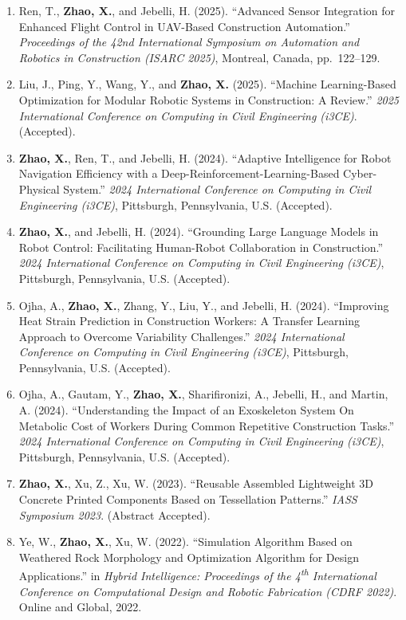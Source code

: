 \documentclass[11pt,a4paper]{article}
\begin{document}
\begin{enumerate}[leftmargin=1.5em, resume]
    \item Ren, T., \textbf{Zhao, X.}, and Jebelli, H. (2025). ``Advanced Sensor Integration for Enhanced Flight Control in UAV-Based Construction Automation.'' \textit{Proceedings of the 42nd International Symposium on Automation and Robotics in Construction (ISARC 2025)}, Montreal, Canada, pp.\ 122--129.

    \item Liu, J., Ping, Y., Wang, Y., and \textbf{Zhao, X.} (2025). ``Machine Learning-Based Optimization for Modular Robotic Systems in Construction: A Review.'' \textit{2025 International Conference on Computing in Civil Engineering (i3CE)}. (Accepted).

    \item \textbf{Zhao, X.}, Ren, T., and Jebelli, H. (2024). ``Adaptive Intelligence for Robot Navigation Efficiency with a Deep-Reinforcement-Learning-Based Cyber-Physical System.'' \textit{2024 International Conference on Computing in Civil Engineering (i3CE)}, Pittsburgh, Pennsylvania, U.S. (Accepted).

    \item \textbf{Zhao, X.}, and Jebelli, H. (2024). ``Grounding Large Language Models in Robot Control: Facilitating Human-Robot Collaboration in Construction.'' \textit{2024 International Conference on Computing in Civil Engineering (i3CE)}, Pittsburgh, Pennsylvania, U.S. (Accepted).

    \item Ojha, A., \textbf{Zhao, X.}, Zhang, Y., Liu, Y., and Jebelli, H. (2024). ``Improving Heat Strain Prediction in Construction Workers: A Transfer Learning Approach to Overcome Variability Challenges.'' \textit{2024 International Conference on Computing in Civil Engineering (i3CE)}, Pittsburgh, Pennsylvania, U.S. (Accepted).

    \item Ojha, A., Gautam, Y., \textbf{Zhao, X.}, Sharifironizi, A., Jebelli, H., and Martin, A. (2024). ``Understanding the Impact of an Exoskeleton System On Metabolic Cost of Workers During Common Repetitive Construction Tasks.'' \textit{2024 International Conference on Computing in Civil Engineering (i3CE)}, Pittsburgh, Pennsylvania, U.S. (Accepted).

    \item \textbf{Zhao, X.}, Xu, Z., Xu, W. (2023). ``Reusable Assembled Lightweight 3D Concrete Printed Components Based on Tessellation Patterns.'' \textit{IASS Symposium 2023}. (Abstract Accepted).

    \item Ye, W., \textbf{Zhao, X.}, Xu, W. (2022). ``Simulation Algorithm Based on Weathered Rock Morphology and Optimization Algorithm for Design Applications.'' in \textit{Hybrid Intelligence: Proceedings of the 4\textsuperscript{th} International Conference on Computational Design and Robotic Fabrication (CDRF 2022)}. Online and Global, 2022.
\end{enumerate}
\end{document}
